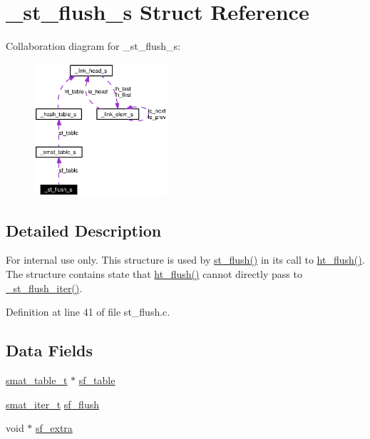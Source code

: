 \hypertarget{struct__st__flush__s}{
\section{\_\-st\_\-flush\_\-s Struct Reference}
\label{struct__st__flush__s}
}
Collaboration diagram for \_\-st\_\-flush\_\-s:\begin{figure}[H]
\begin{center}
\leavevmode
\includegraphics[width=140pt]{struct__st__flush__s__coll__graph}
\end{center}
\end{figure}


\subsection{Detailed Description}
\begin{Desc}
\item[For internal use only.]
This structure is used by \hyperlink{group__dbprim__smat_ga17}{st\_\-flush()} in its call to \hyperlink{group__dbprim__hash_ga15}{ht\_\-flush()}. The structure contains state that \hyperlink{group__dbprim__hash_ga15}{ht\_\-flush()} cannot directly pass to \hyperlink{group__dbprim__smat_ga30}{\_\-st\_\-flush\_\-iter()}.\end{Desc}




Definition at line 41 of file st\_\-flush.c.\subsection*{Data Fields}
\begin{CompactItemize}
\item 
\hyperlink{struct__smat__table__s}{smat\_\-table\_\-t} $\ast$ \hyperlink{struct__st__flush__s_o0}{sf\_\-table}
\item 
\hyperlink{group__dbprim__smat_ga4}{smat\_\-iter\_\-t} \hyperlink{struct__st__flush__s_o1}{sf\_\-flush}
\item 
void $\ast$ \hyperlink{struct__st__flush__s_o2}{sf\_\-extra}
\end{CompactItemize}


